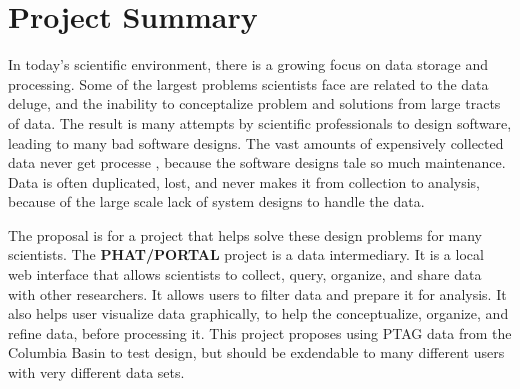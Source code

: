 

 


\section{Project Summary}
In today's scientific environment, there is a growing focus on data storage and
processing. Some of the largest problems scientists face are related to the data
deluge, and the inability to conceptalize problem and solutions from large
tracts of data. The result is many attempts by scientific professionals to 
design software, leading to many bad software designs. The vast amounts of 
expensively collected data never get processe \cite{need a citation here}, 
because the software designs tale so much maintenance. Data is often duplicated,
lost, and never makes it from collection to analysis, because of the large 
scale lack of system designs to handle the data.

The proposal is for a project that helps solve these design problems for 
many scientists. The \textbf{PHAT/PORTAL} project is a data intermediary. It
is a local web interface that allows scientists to collect, query, organize, 
and share data with other researchers. It allows users to filter data and 
prepare it for analysis. It also helps user visualize data graphically, to 
help the conceptualize, organize, and refine data, before processing it. This 
project proposes using PTAG data from the Columbia Basin to test design,
but should be exdendable to many different users with very different data sets.

